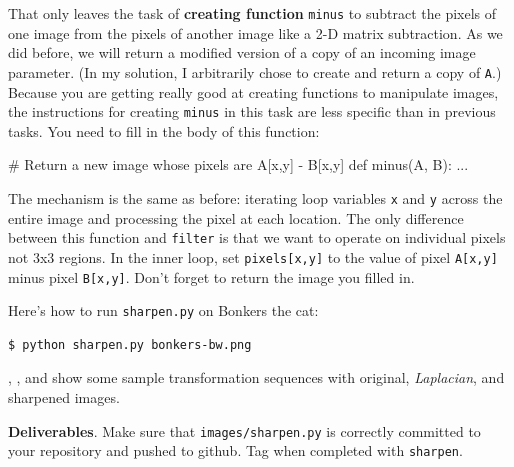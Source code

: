 That only leaves the task of {\bf creating function} {\tt minus} to subtract the pixels of one image from the pixels of another image like a 2-D matrix subtraction.  As we did before, we will return a modified version of a copy of an incoming image parameter. (In my solution, I arbitrarily chose to create and return a copy of {\tt A}.) Because you are getting really good at creating functions to manipulate images, the instructions for creating {\tt minus} in this  task are less specific than in previous tasks.  You need to fill in the body of this function:
 
\begin{pyverbatim}
# Return a new image whose pixels are A[x,y] - B[x,y]
def minus(A, B):
	...
\end{pyverbatim}

The mechanism is the same as before: iterating loop variables {\tt x} and {\tt y} across the entire image and processing the pixel at each location. The only difference between this function and {\tt filter} is that we want to operate on individual pixels not 3x3 regions.  In the inner loop, set {\tt pixels[x,y]} to the value of pixel {\tt A[x,y]} minus pixel {\tt B[x,y]}. Don't forget to return the image you filled in.

Here's how to run {\tt sharpen.py} on Bonkers the cat:

\begin{lstlisting}[style=BashInputStyle]
$ python sharpen.py bonkers-bw.png
\end{lstlisting}

\noindent {}, , and  show some sample transformation sequences with original, {\em Laplacian}, and sharpened images.

\begin{callout}{\bcplume}
{\bf Deliverables}. Make sure that {\tt images/sharpen.py} is correctly committed to your repository and pushed to github. Tag when completed with {\tt sharpen}. 
\end{callout}

